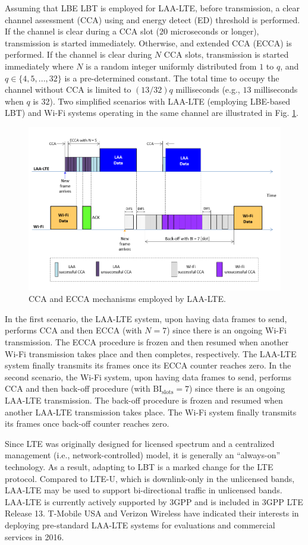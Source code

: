 Assuming that LBE LBT is employed for LAA-LTE, before transmission, a clear channel assessment  (CCA) using and energy detect (ED) threshold is performed. If the channel is clear during a CCA slot ($20$ microseconds or longer), transmission is started immediately. Otherwise, and extended CCA (ECCA) is performed. If the channel is clear during $N$ CCA slots, transmission is started immediately where $N$ is a random integer uniformly distributed from $1$ to $q$, and $q \in \{4,5,...,32\}$ is a pre-determined constant. The total time to occupy the channel without CCA is limited to $(13/32)q$ milliseconds (e.g., $13$ milliseconds when $q$ is $32$). Two simplified scenarios with LAA-LTE (employing LBE-based LBT) and Wi-Fi systems operating in the same channel are illustrated in Fig. \ref{figs:LAA-LTE}. 
\begin{figure}[!ht]
	\centering
	\includegraphics[width=0.9\columnwidth]{figs/LAA-LTE}
	\caption{CCA and ECCA mechanisms employed by LAA-LTE.}
	\label{figs:LAA-LTE}
\end{figure}
In the first scenario, the LAA-LTE system, upon having data frames to send, performs CCA and then ECCA (with $N=7$) since there is an ongoing Wi-Fi transmission. The ECCA procedure is frozen and then resumed when another Wi-Fi transmission takes place and then completes, respectively. The LAA-LTE system finally transmits its frames once its ECCA counter reaches zero. In the second scenario, the Wi-Fi system, upon having data frames to send, performs CCA and then back-off procedure (with $\mathrm{BI_{slots}} = 7$) since there is an ongoing LAA-LTE transmission. The back-off procedure is frozen and resumed when another LAA-LTE transmission takes place. The Wi-Fi system finally transmits its frames once back-off counter reaches zero.

Since LTE was originally designed for licensed spectrum and a centralized management (i.e., network-controlled) model, it is generally an ``always-on'' technology. As a result, adapting to LBT is a marked change for the LTE protocol. Compared to LTE-U, which is downlink-only in the unlicensed bands, LAA-LTE may be used to support bi-directional traffic in unlicensed bands. LAA-LTE is currently actively supported by 3GPP and is included in 3GPP LTE Release 13. T-Mobile USA and Verizon Wireless have indicated their interests in deploying pre-standard LAA-LTE systems for evaluations and commercial services in 2016.



